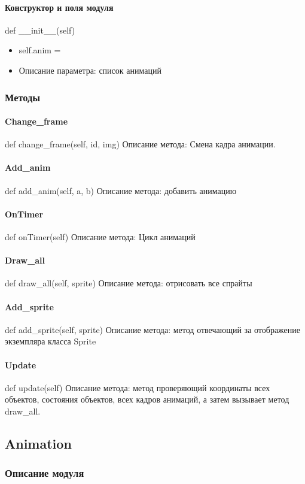 \paragraph{Конструктор и поля модуля}
def \_\_init\_\_(self)
\begin{itemize}
	\item self.anim = {}
	\item Описание параметра: список анимаций
\end{itemize}
\subsubsection{Методы}
\paragraph{Change\_frame}
def change\_frame(self, id, img)
Описание метода: Смена кадра анимации.
\paragraph{Add\_anim}
def add\_anim(self, a, b)
Описание метода: добавить анимацию
\paragraph{OnTimer}
def onTimer(self)
Описание метода: Цикл анимаций
\paragraph{Draw\_all}
def draw\_all(self, sprite)
Описание метода: отрисовать все спрайты
\paragraph{Add\_sprite}
def add\_sprite(self, sprite)
Описание метода: метод отвечающий за отображение экземпляра класса Sprite
\paragraph{Update}
def update(self)
Описание метода: метод проверяющий координаты всех объектов, состояния объектов, всех кадров анимаций, а затем вызывает метод draw\_all.

\subsection{Animation}
\subsubsection{Описание модуля}
